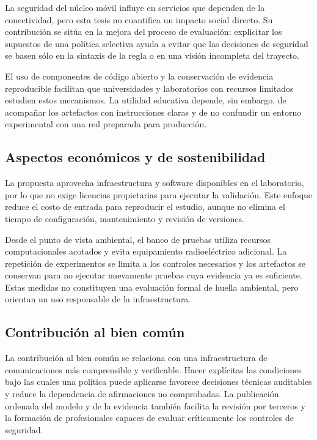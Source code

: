 La seguridad del núcleo móvil influye en servicios que dependen de la conectividad, pero esta tesis no cuantifica un impacto social directo. Su contribución se sitúa en la mejora del proceso de evaluación: explicitar los supuestos de una política selectiva ayuda a evitar que las decisiones de seguridad se basen sólo en la sintaxis de la regla o en una visión incompleta del trayecto.

El uso de componentes de código abierto y la conservación de evidencia reproducible facilitan que universidades y laboratorios con recursos limitados estudien estos mecanismos. La utilidad educativa depende, sin embargo, de acompañar los artefactos con instrucciones claras y de no confundir un entorno experimental con una red preparada para producción.

\subsection{Aspectos económicos y de sostenibilidad}

La propuesta aprovecha infraestructura y software disponibles en el laboratorio, por lo que no exige licencias propietarias para ejecutar la validación. Este enfoque reduce el costo de entrada para reproducir el estudio, aunque no elimina el tiempo de configuración, mantenimiento y revisión de versiones.

Desde el punto de vista ambiental, el banco de pruebas utiliza recursos computacionales acotados y evita equipamiento radioeléctrico adicional. La repetición de experimentos se limita a los controles necesarios y los artefactos se conservan para no ejecutar nuevamente pruebas cuya evidencia ya es suficiente. Estas medidas no constituyen una evaluación formal de huella ambiental, pero orientan un uso responsable de la infraestructura.

\subsection{Contribución al bien común}

La contribución al bien común se relaciona con una infraestructura de comunicaciones más comprensible y verificable. Hacer explícitas las condiciones bajo las cuales una política puede aplicarse favorece decisiones técnicas auditables y reduce la dependencia de afirmaciones no comprobadas. La publicación ordenada del modelo y de la evidencia también facilita la revisión por terceros y la formación de profesionales capaces de evaluar críticamente los controles de seguridad.

